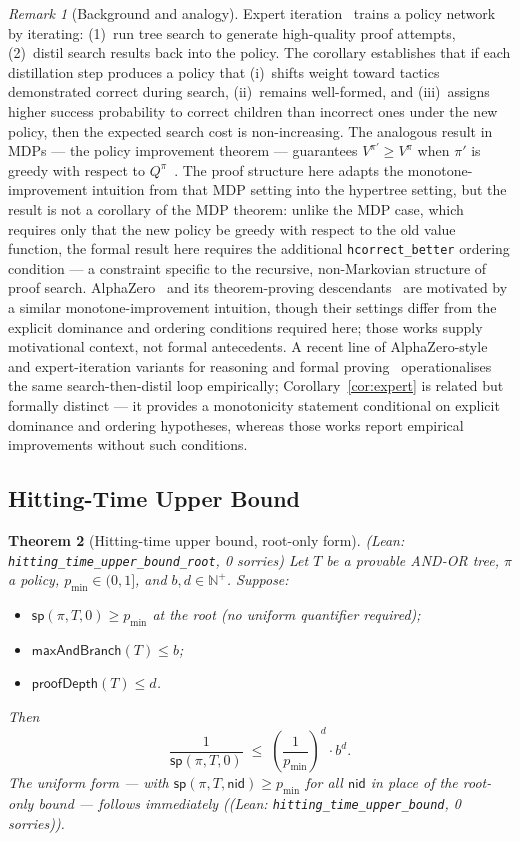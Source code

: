 \documentclass[reqno,11pt]{amsart}
\newcommand{\NN}{\mathbb{N}}
\newcommand{\sP}{\mathsf{sp}}
\newcommand{\maxAnd}{\mathsf{maxAndBranch}}
\newcommand{\proofDepth}{\mathsf{proofDepth}}
\newcommand{\nid}{\mathsf{nid}}
\newcommand{\leanverified}[1]{\textup{(Lean: \texttt{\small #1}, 0 sorries)}}
\theoremstyle{plain}
\newtheorem{theorem}{Theorem}[section]
\theoremstyle{definition}
\theoremstyle{remark}
\newtheorem{remark}[theorem]{Remark}
\begin{document}
\begin{remark}[Background and analogy]
Expert iteration~\citep{Anthony2017} trains a policy network by iterating: (1)~run tree search to generate high-quality proof attempts, (2)~distil search results back into the policy. The corollary establishes that if each distillation step produces a policy that (i)~shifts weight toward tactics demonstrated correct during search, (ii)~remains well-formed, and (iii)~assigns higher success probability to correct children than incorrect ones under the new policy, then the expected search cost is non-increasing. The analogous result in MDPs --- the policy improvement theorem --- guarantees $V^{\pi'} \ge V^{\pi}$ when $\pi'$ is greedy with respect to $Q^{\pi}$~\citep{Bellman1957,Puterman1994,SuttonBarto2018}. The proof structure here adapts the monotone-improvement intuition from that MDP setting into the hypertree setting, but the result is not a corollary of the MDP theorem: unlike the MDP case, which requires only that the new policy be greedy with respect to the old value function, the formal result here requires the additional \texttt{hcorrect\_better} ordering condition --- a constraint specific to the recursive, non-Markovian structure of proof search. AlphaZero~\citep{Silver2018} and its theorem-proving descendants~\citep{PoluHan2020,Han2021} are motivated by a similar monotone-improvement intuition, though their settings differ from the explicit dominance and ordering conditions required here; those works supply motivational context, not formal antecedents. A recent line of AlphaZero-style and expert-iteration variants for reasoning and formal proving~\citep{FengEtAl2023,XieEtAl2024,InternLMStepProver2024} operationalises the same search-then-distil loop empirically; Corollary~\ref{cor:expert} is related but formally distinct --- it provides a monotonicity statement conditional on explicit dominance and ordering hypotheses, whereas those works report empirical improvements without such conditions.
\end{remark}

\subsection{Hitting-Time Upper Bound}

\begin{theorem}[Hitting-time upper bound, root-only form]\label{thm:upper}
\leanverified{hitting\_time\_upper\_bound\_root}
Let $T$ be a provable AND-OR tree, $\pi$ a policy, $p_{\min} \in (0,1]$, and $b, d \in \NN^+$. Suppose:
\begin{itemize}[leftmargin=*]
\item $\sP(\pi, T, 0) \ge p_{\min}$ \emph{at the root} (no uniform quantifier required);
\item $\maxAnd(T) \le b$;
\item $\proofDepth(T) \le d$.
\end{itemize}
Then
\[
\frac{1}{\sP(\pi, T, 0)} \;\le\; \left(\frac{1}{p_{\min}}\right)^d \cdot b^d.
\]
The uniform form --- with $\sP(\pi, T, \nid) \ge p_{\min}$ for all $\nid$ in place of the root-only bound --- follows immediately (\leanverified{hitting\_time\_upper\_bound}).
\end{theorem}
\end{document}
